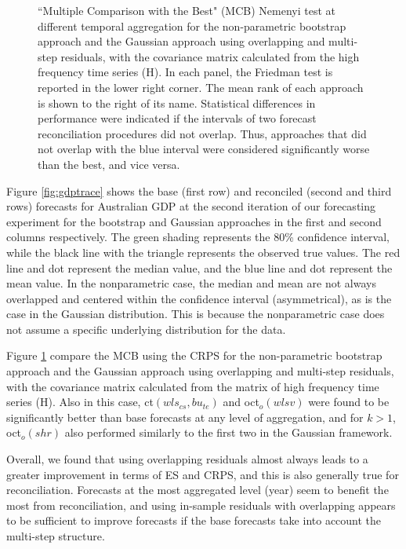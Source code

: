 \documentclass[a4paper,11pt]{article}
\theoremstyle{definition}
\begin{document}
\begin{figure}[p]
\caption{“Multiple Comparison with the Best" (MCB) Nemenyi test at different temporal aggregation for the non-parametric bootstrap approach and the Gaussian approach using overlapping and multi-step residuals, with the covariance matrix calculated from the high frequency time series (H). In each panel, the Friedman test is reported in the lower right corner. The mean rank of each approach is shown to the right of its name. Statistical differences in performance were indicated if the intervals of two forecast reconciliation procedures did not overlap. Thus, approaches that did not overlap with the blue interval were considered significantly worse than the best, and vice versa.}
\label{fig:mcb}
\end{figure}

Figure \ref{fig:gdptrace} shows the base (first row) and reconciled (second and third rows) forecasts for Australian GDP at the second iteration of our forecasting experiment for the bootstrap and Gaussian approaches in the first and second columns respectively. The green shading represents the 80\% confidence interval, while the black line with the triangle represents the observed true values. The red line and dot represent the median value, and the blue line and dot represent the mean value. In the nonparametric case, the median and mean are not always overlapped and centered within the confidence interval (asymmetrical), as is the case in the Gaussian distribution. This is because the nonparametric case does not assume a specific underlying distribution for the data.

Figure \ref{fig:mcb} compare the MCB using the CRPS for the non-parametric bootstrap approach and the Gaussian approach using overlapping and multi-step residuals, with the covariance matrix calculated from the matrix of high frequency time series (H). Also in this case, ct$(wls_{cs},bu_{te})$ and oct$_o(wlsv)$ were found to be significantly better than base forecasts at any level of aggregation, and for $k>1$, oct$_{o}(shr)$ also performed similarly to the first two in the Gaussian framework.

Overall, we found that using overlapping residuals almost always leads to a greater improvement in terms of ES and CRPS, and this is also generally true for reconciliation. Forecasts at the most aggregated level (year) seem to benefit the most from reconciliation, and using in-sample residuals with overlapping appears to be sufficient to improve forecasts if the base forecasts take into account the multi-step structure.
\end{document}
